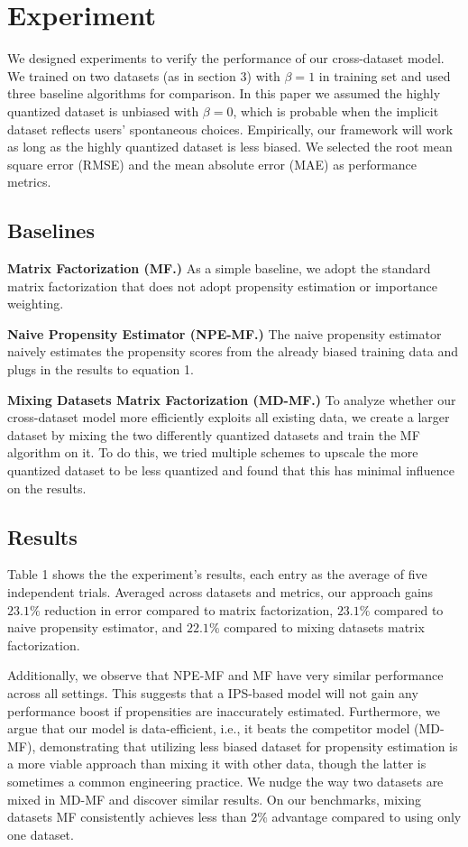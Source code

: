 \documentclass{article}
\begin{document}
\section{Experiment}
We designed experiments to verify the performance of our cross-dataset model. We trained on two datasets (as in section 3) with $\beta =1$ in training set and used three baseline algorithms for comparison. In this paper we assumed the highly quantized dataset is unbiased with $\beta=0$, which is probable when the implicit dataset reflects users' spontaneous choices. Empirically, our framework will work as long as the highly quantized dataset is less biased. We selected the root mean square error (RMSE) and the mean absolute error (MAE) as performance metrics. 

\subsection{Baselines}
\textbf{Matrix Factorization (MF.)}
As a simple baseline, we adopt the standard matrix factorization that does not adopt propensity estimation or importance weighting.

\textbf{Naive Propensity Estimator (NPE-MF.)}
The naive propensity estimator naively estimates the propensity scores from the already biased training data and plugs in the results to equation 1.

\textbf{Mixing Datasets Matrix Factorization (MD-MF.)}
To analyze whether our cross-dataset model more efficiently exploits all existing data, we create a larger dataset by mixing the two differently quantized datasets and train the MF algorithm on it. To do this, we tried multiple schemes to upscale the more quantized dataset to be less quantized and found that this has minimal influence on the results.

\subsection{Results}
Table 1 shows the the experiment's results, each entry as the average of five independent trials. Averaged across datasets and metrics, our approach gains $23.1\%$ reduction in error compared to matrix factorization, $23.1\%$ compared to naive propensity estimator, and $22.1\%$ compared to mixing datasets matrix factorization. 

Additionally, we observe that NPE-MF and MF have very similar performance across all settings. This suggests that a IPS-based model will not gain any performance boost if propensities are inaccurately estimated. Furthermore, we argue that our model is data-efficient, i.e., it beats the competitor model (MD-MF), demonstrating that utilizing less biased dataset for propensity estimation is a more viable approach than mixing it with other data, though the latter is sometimes a common engineering practice. We nudge the way two datasets are mixed in MD-MF and discover similar results. On our benchmarks, mixing datasets MF consistently achieves less than $2\%$ advantage compared to using only one dataset.
\end{document}
